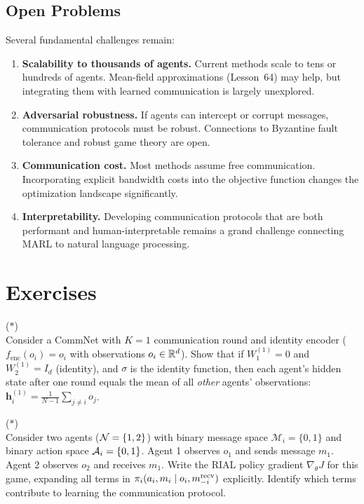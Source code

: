\documentclass[11pt,a4paper]{article}
\begin{document}
\subsection{Open Problems}

Several fundamental challenges remain:
\begin{enumerate}[nosep]
  \item \textbf{Scalability to thousands of agents.}  Current
    methods scale to tens or hundreds of agents.  Mean-field
    approximations (Lesson~64) may help, but integrating them
    with learned communication is largely unexplored.
  \item \textbf{Adversarial robustness.}  If agents can
    intercept or corrupt messages, communication protocols must
    be robust.  Connections to Byzantine fault tolerance and
    robust game theory are open.
  \item \textbf{Communication cost.}  Most methods assume free
    communication.  Incorporating explicit bandwidth costs into
    the objective function changes the optimization landscape
    significantly.
  \item \textbf{Interpretability.}  Developing communication
    protocols that are both performant and human-interpretable
    remains a grand challenge connecting MARL to natural language
    processing.
\end{enumerate}

\section{Exercises}
\label{sec:exercises}

\begin{exercise}
\textnormal{(\(*\))} \\
Consider a CommNet with $K = 1$ communication round and identity
encoder ($f_{\mathrm{enc}}(o_i) = o_i$ with observations
$o_i \in \mathbb{R}^d$).  Show that if $W_1^{(1)} = 0$ and
$W_2^{(1)} = I_d$ (identity), and $\sigma$ is the identity
function, then each agent's hidden state after one round equals
the mean of all \emph{other} agents' observations:
$\mathbf{h}_i^{(1)} = \frac{1}{N-1} \sum_{j \neq i} o_j$.
\end{exercise}

\begin{exercise}
\textnormal{(\(*\))} \\
Consider two agents ($\mathcal{N} = \{1, 2\}$) with binary
message space $\mathcal{M}_i = \{0, 1\}$ and binary action
space $\mathcal{A}_i = \{0, 1\}$.  Agent 1 observes $o_1$ and
sends message $m_1$.  Agent 2 observes $o_2$ and receives
$m_1$.  Write the RIAL policy gradient $\nabla_\theta J$ for
this game, expanding all terms in $\pi_i(a_i, m_i
\mid o_i, m_{-i}^{\mathrm{recv}})$ explicitly.  Identify which
terms contribute to learning the communication protocol.
\end{exercise}
\end{document}
